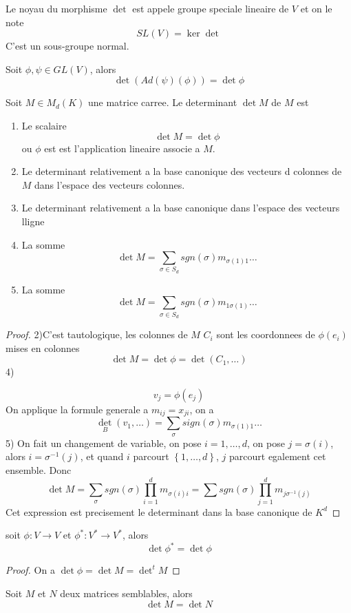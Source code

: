 \documentclass[../main.tex]{subfiles}
\begin{document}
\begin{defn}
Le noyau du morphisme $\det$ est appele groupe speciale lineaire de $V$ et on le note
\[ 
	SL( V) = \ker \det
\]
C'est un sous-groupe normal.
\end{defn}
\begin{rmq}
	Soit $\phi, \psi \in GL( V) $, alors
	\[ 
		\det ( Ad( \psi) ( \phi) )  = \det \phi
	\]
	
\end{rmq}
\begin{defn}
	Soit $M \in M_d( K) $ une matrice carree. Le determinant $\det M$ de $M$ est
	\begin{enumerate}
	\item Le scalaire
		\[ 
		\det M = \det \phi
		\]
		ou $\phi$ est est l'application lineaire associe a $M$.
	\item Le determinant relativement a la base canonique des vecteurs d colonnes de $M$ dans l'espace des vecteurs colonnes.
	\item Le determinant relativement a la base canonique dans l'espace des vecteurs lligne
	\item La somme 
		\[ 
			\det M = \sum_{\sigma \in S_d} sgn( \sigma) m_{\sigma( 1) 1} \ldots
		\]

	\item La somme
		\[ 
			\det M = \sum_{\sigma \in S_d} sgn( \sigma) m_{ 1\sigma( 1)} \ldots
		\]

		
	\end{enumerate}
	
\end{defn}
\begin{proof}
	2)C'est tautologique, les colonnes de $M$ $C_i$ sont les coordonnees de $\phi( e_i) $ mises en colonnes
	\[ 
		\det M = \det \phi = \det ( C_1, \ldots) 	
	\]
4)

\[ 
	v_j = \phi( e_j) 
\]
On applique la formule generale a $m_{ij} = x_{ji} $, on a
\[ 
	\det_B( v_1, \ldots) = \sum_{\sigma} sign( \sigma) m_{\sigma( 1) 1} \ldots
\]
5)
On fait un changement de variable, on pose $i=1, \ldots, d$, on pose $j = \sigma( i) $, alors $i = \sigma^{-1}( j) $, et quand $i$ parcourt $ \left\{ 1, \ldots, d \right\} $, $j$ parcourt egalement cet ensemble. Donc
\[ 
	\det M = \sum_\sigma sgn( \sigma) \prod_{i=1}^{d}m_{\sigma( i) i} = \sum sgn( \sigma) \prod_{j=1}^{d}m_{j\sigma^{-1}( j) } 
\]
Cet expression est precisement le determinant dans la base canonique de $K^{d}$


\end{proof}
\begin{crly}
soit $\phi: V \to V$ et $\phi^{*}: V^{*}\to V^{*}$, alors
\[ 
\det \phi^{*} = \det \phi
\]

\end{crly}
\begin{proof}
On a $\det \phi = \det M = \det ^{t}M$
\end{proof}
\begin{crly}
Soit $M$ et $N$ deux matrices semblables, alors
\[ 
\det M = \det N
\]

\end{crly}
\end{document}
